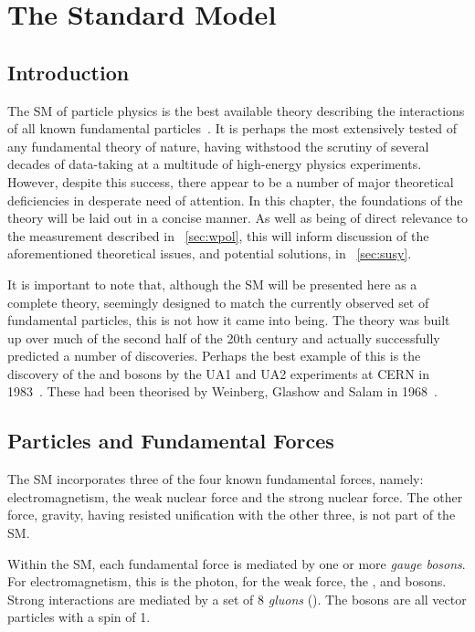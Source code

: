 \chapter{The Standard Model}
\label{sec:sm}
\section{Introduction}
The \acl{SM} of particle physics is the best available theory describing the
interactions of all known fundamental
particles~\cite{aitchison,griffiths,peskin_schroeder,sm_intro,glashow,weinberg,salam,englert,higgs}. It
is perhaps the most extensively tested of any fundamental theory of nature,
having withstood the scrutiny of several decades of data-taking at a multitude
of high-energy physics experiments. However, despite this success, there appear
to be a number of major theoretical deficiencies in desperate need of
attention. In this chapter, the foundations of the theory will be laid out in a
concise manner. As well as being of direct relevance to the measurement
described in \chap~\ref{sec:wpol}, this will inform discussion of the
aforementioned theoretical issues, and potential solutions, in
\chap~\ref{sec:susy}.

It is important to note that, although the \ac{SM} will be presented here as a
complete theory, seemingly designed to match the currently observed set of
fundamental particles, this is not how it came into being. The theory was built
up over much of the second half of the 20th century and actually successfully
predicted a number of discoveries. Perhaps the best example of this is the
discovery of the \PW and \PZ bosons by the UA1 and UA2 experiments at \ac{CERN}
in 1983~\cite{ua1_w,ua1_z}. These had been theorised by Weinberg,
Glashow and Salam in 1968~\cite{weinberg,glashow,salam}.

\section{Particles and Fundamental Forces}
\label{sec:theory:particles}
The \ac{SM} incorporates three of the four known fundamental forces, namely:
electromagnetism, the weak nuclear force and the strong nuclear force. The other
force, gravity, having resisted unification with the other three, is not part of
the \ac{SM}.

Within the \ac{SM}, each fundamental force is mediated by one or more \emph{gauge
bosons}. For electromagnetism, this is the photon, for the weak force, the
\PWp, \PWm and \PZ bosons. Strong interactions are mediated by a set of 8
\emph{gluons} (\Pg). The bosons are all vector particles with a spin of 1.

